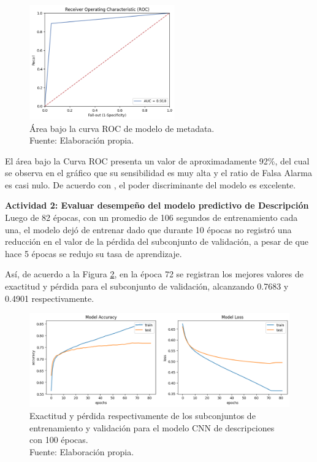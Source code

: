\begin{figure}[!ht]
	\begin{center}
		\includegraphics[width=0.56\textwidth]{5/figures/metadata_auc.png}
		\caption[Área bajo la curva ROC de modelo de metadata]{Área bajo la curva ROC de modelo de metadata.\\
		Fuente: Elaboración propia.}
		\label{5:fig3}
	\end{center}
\end{figure}

El área bajo la Curva ROC presenta un valor de aproximadamente 92\%, del cual se observa en el gráfico que su sensibilidad es muy alta y el ratio de Falsa Alarma es casi nulo. De acuerdo con \cite{bk_britos2006datamining}, el poder discriminante del modelo es excelente.

\textbf{Actividad 2: Evaluar desempeño del modelo predictivo de Descripción}
\\
Luego de 82 épocas, con un promedio de 106 segundos de entrenamiento cada una, el modelo dejó de entrenar dado que durante 10 épocas no registró una reducción en el valor de la pérdida del subconjunto de validación, a pesar de que hace 5 épocas se redujo su tasa de aprendizaje.

Así, de acuerdo a la Figura \ref{5:fig4}, en la época 72 se registran los mejores valores de exactitud y pérdida para el subconjunto de validación, alcanzando 0.7683 y 0.4901 respectivamente.

\begin{figure}[!ht]
	\begin{center}
		\includegraphics[width=1\textwidth]{5/figures/description_model_acc_loss.png}
		\caption[Exactitud y pérdida respectivamente de los subconjuntos de entrenamiento y validación para el modelo CNN de descripciones con 100 épocas]{Exactitud y pérdida respectivamente de los subconjuntos de entrenamiento y validación para el modelo CNN de descripciones con 100 épocas.\\
		Fuente: Elaboración propia.}
		\label{5:fig4}
	\end{center}
\end{figure}

